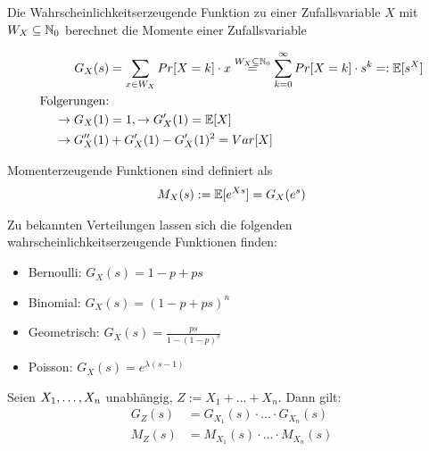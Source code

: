 \begin{definition}
	Die Wahrscheinlichkeitserzeugende Funktion zu einer Zufallsvariable $X$ mit $W_X \subseteq \mathbb{N}_0$ berechnet die Momente einer Zufallsvariable 
	
	\begin{align*}
		G_X(s) &= \sum_{x \in W_X} Pr[X = k] \cdot x \overset{W_X \subseteq \mathbb{N}_0}{=} \sum_{k=0}^{\infty}Pr[X = k] \cdot s^k =: \mathbb{E}[s^X] \\
		\text{Folgerungen:} \\
	    \rightarrow G_X(1) &= 1, \rightarrow G'_X(1) = \mathbb{E}[X] \\
	    \rightarrow G''_X(1) &+ G'_X(1) - G'_X(1)^2 = Var[X]
	\end{align*}
\end{definition}

\begin{definition}
	Momenterzeugende Funktionen sind definiert als
	\begin{align*}
		M_X(s) := \mathbb{E}[e^{Xs}] = G_X(e^s)
	\end{align*}
\end{definition}

\pagebreak

\begin{satz}
	Zu bekannten Verteilungen lassen sich die folgenden wahrscheinlichkeitserzeugende Funktionen finden:
	\begin{itemize}[noitemsep]
		\item Bernoulli: $G_X(s) = 1 - p + ps$		
		\item Binomial:  $G_X(s) = (1 - p + ps)^n$
		\item Geometrisch: $G_X(s) = \frac{ps}{1 - (1 - p)^s}$
		\item Poisson: $G_X(s) = e^{\lambda(s - 1)}$
	\end{itemize}
\end{satz}

\begin{satz}
	Seien $X_1, \dots, X_n$ unabhängig, $Z := X_1 + ... + X_n$. Dann gilt:
	\begin{align*}
		G_Z(s) &= G_{X_1}(s) \cdot ... \cdot G_{X_n}(s) \\		
		M_Z(s) &= M_{X_1}(s) \cdot ... \cdot M_{X_n}(s) \\
	\end{align*}
\end{satz}

